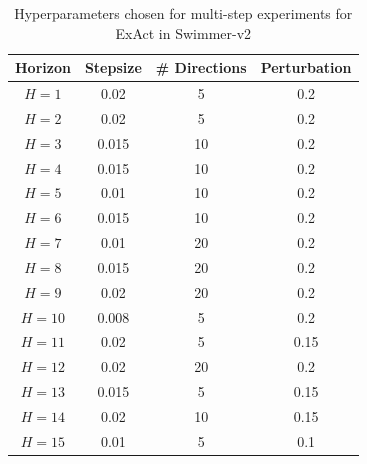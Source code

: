 \begin{table}[ht]
    \centering
    \begin{tabular}{|c|c|c|c|}
    \hline
      \textbf{Horizon} & \textbf{Stepsize} &
                                             \textbf{\#
                                             Directions} &
                                                           \textbf{Perturbation}\\
      \hline
      $H = 1$ & 0.02  &5  & 0.2 \\
      \hline
      $H = 2$ & 0.02  & 5 & 0.2 \\
      \hline
      $H = 3$ & 0.015  & 10 & 0.2 \\
      \hline
      $H = 4$ & 0.015  & 10 & 0.2 \\
      \hline
      $H = 5$ & 0.01  & 10 & 0.2 \\
      \hline
      $H = 6$ & 0.015  & 10 & 0.2 \\
      \hline
      $H = 7$ & 0.01  & 20 & 0.2 \\
      \hline
      $H = 8$ & 0.015  & 20 & 0.2 \\
      \hline
      $H = 9$ & 0.02  & 20 & 0.2 \\
      \hline
      $H = 10$ & 0.008  & 5 & 0.2 \\
      \hline
      $H = 11$ & 0.02  & 5 & 0.15 \\
      \hline
      $H = 12$ & 0.02  & 20 & 0.2 \\
      \hline
      $H = 13$ & 0.015  & 5 & 0.15 \\
      \hline
      $H = 14$ & 0.02  & 10 &0.15  \\
      \hline
      $H = 15$ & 0.01  & 5 & 0.1 \\
      \hline
    \end{tabular}
    \caption{Hyperparameters chosen for multi-step experiments for ExAct
    in Swimmer-v2}
    \label{tab:chosen-hyperparam-multi-exact-swimmer}
\end{table}

